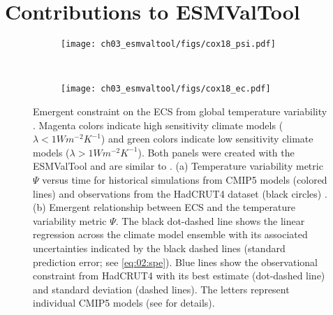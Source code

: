 \section{Contributions to \acs{ESMValTool}}
\label{sec:03:contributions_to_esmvaltool}

\begin{figure}[t]
  \centering
  \begin{subfigure}[t]{\SubfigureWidth{}}
    \texttt{[image: ch03\_esmvaltool/figs/cox18\_psi.pdf]}
    \caption{}
    \label{fig:03:cox18:a}
  \end{subfigure}
  ~
  \begin{subfigure}[t]{\SubfigureWidth{}}
    \texttt{[image: ch03\_esmvaltool/figs/cox18\_ec.pdf]}
    \caption{}
    \label{fig:03:cox18:b}
  \end{subfigure}
  \caption{Emergent constraint on the \acf{ECS} from global temperature
    variability \autocite{Cox2018}. Magenta colors indicate high sensitivity
    climate models ($\lambda < 1 \unit{W m^{-2} K^{-1}}$) and green colors
    indicate low sensitivity climate models ($\lambda > 1 \unit{W m^{-2}
    K^{-1}}$). Both panels were created with the \acs{ESMValTool} and are
    similar to \textcite{Cox2018}. (a) Temperature variability metric $\Psi$
    versus time for historical simulations from \acs{CMIP}5 models (colored
    lines) and observations from the HadCRUT4 dataset (black circles)
    \autocite{Morice2012}. (b) Emergent relationship between \acs{ECS} and the
    temperature variability metric $\Psi$. The black dot-dashed line shows the
    linear regression across the climate model ensemble with its associated
    uncertainties indicated by the black dashed lines (standard prediction
    error; see \cref{eq:02:spe}). Blue lines show the observational constraint
    from HadCRUT4 with its best estimate (dot-dashed line) and standard
    deviation (dashed lines). The letters represent individual \acs{CMIP}5
    models (see \textcite{Cox2018} for details).}
  \label{fig:03:cox18}
\end{figure}

